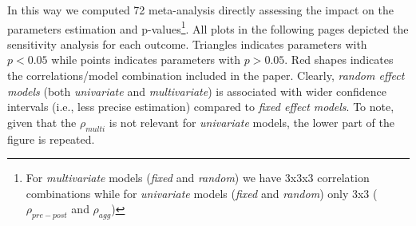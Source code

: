 \documentclass[
]{article}
\begin{document}
In this way we computed 72 meta-analysis directly assessing the impact on the parameters estimation and p-values\footnote{For \emph{multivariate} models (\emph{fixed} and \emph{random}) we have 3x3x3 correlation combinations while for \emph{univariate} models (\emph{fixed} and \emph{random}) only 3x3 (\(\rho_{pre-post}\) and \(\rho_{agg}\))}. All plots in the following pages depicted the sensitivity analysis for each outcome. Triangles indicates parameters with \(p < 0.05\) while points indicates parameters with \(p > 0.05\). Red shapes indicates the correlations/model combination included in the paper. Clearly, \emph{random effect models} (both \emph{univariate} and \emph{multivariate}) is associated with wider confidence intervals (i.e., less precise estimation) compared to \emph{fixed effect models}. To note, given that the \(\rho_{multi}\) is not relevant for \emph{univariate} models, the lower part of the figure is repeated.
\end{document}
